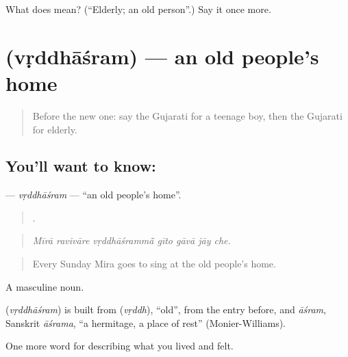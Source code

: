 \begin{tcolorbox}[breakable,colback=teal!4,colframe=teal!35!black,title={Before you move on}]
What does  mean? (\textquotedblleft{}Elderly; an old person\textquotedblright{}.) Say it once more.
\end{tcolorbox}
\section[\texorpdfstring{\gu{વૃદ્ધાશ્રમ} (vṛddhāśram)}{વૃદ્ધાશ્રમ (vṛddhāśram)}]{ (vṛddhāśram) — an old people's home}

\label{lesson:GU-C494-vrddhasram}



\begin{quote}
Before the new one: say the Gujarati for a teenage boy, then the Gujarati for elderly.
\end{quote}

\subsection*{You'll want to know: }
\textbf{} — \emph{vṛddhāśram} — \textquotedblleft{}an old people's home\textquotedblright{}.

\begin{quote}
      .
\end{quote}

\begin{quote}
\emph{Mīrā ravivāre vṛddhāśrammā̃ gīto gāvā jāy che.}
\end{quote}

\begin{quote}
Every Sunday Mira goes to sing at the old people's home.
\end{quote}

A masculine noun.

\begin{cousinweb}
\textbf{} (\emph{vṛddhāśram}) is built from \textbf{} (\emph{vṛddh}), \textquotedblleft{}old\textquotedblright{}, from the entry before, and \emph{āśram}, Sanskrit \emph{āśrama}, \textquotedblleft{}a hermitage, a place of rest\textquotedblright{} (Monier-Williams).
\end{cousinweb}

\begin{grammarlens}[title={What you've built}]
One more word for describing what you lived and felt.
\end{grammarlens}

